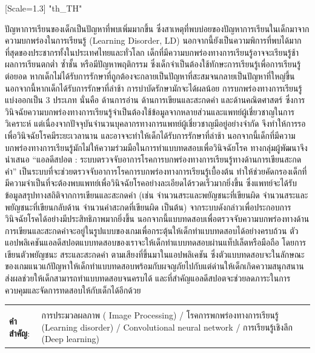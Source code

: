 \documentclass[12pt,oneside,openright,a4paper]{cpe-thai-project}
\begin{document}
{\newfontfamily{}[Scale=1.3]
\XeTeXlinebreaklocale "th_TH"	
\thaifont
\thaiabstract

ปัญหาการเรียนของเด็กเป็นปัญหาที่พบเพิ่มมากขึ้น ซึ่งสาเหตุที่พบบ่อยของปัญหาการเรียนในเด็กมาจากความบกพร่องในการเรียนรู้ (Learning Disorder, LD)
 นอกจากนี้ยังเป็นความพิการที่พบได้มากที่สุดของประชากรทั้งในประเทศไทยและทั่วโลก เด็กที่มีความบกพร่องทางการเรียนรู้อาจจะเรียนรู้ช้า ผลการเรียนตกต่ำ ซ้ำชั้น หรือมีปัญหาพฤติกรรม ซึ่งเด็กจำเป็นต้องใช้ทักษะการเรียนรู้เพื่อการเรียนรู้ต่อยอด
  หากเด็กไม่ได้รับการรักษาที่ถูกต้องจะกลายเป็นปัญหาที่สะสมจนกลายเป็นปัญหาที่ใหญ่ขึ้น นอกจากนี้หากเด็กได้รับการรักษาที่ล่าช้า การบำบัดรักษามักจะได้ผลน้อย  การบกพร่องทางการเรียนรู้แบ่งออกเป็น 3 ประเภท นั่นคือ ด้านการอ่าน ด้านการเขียนและสะกดคำ
   และด้านคณิตศาสตร์ ซึ่งการวินิจฉัยความบกพร่องทางการเรียนรู้จำเป็นต้องใช้ข้อมูลจากหลายส่วนและแพทย์ผู้เชี่ยวชาญในการวิเคราะห์ แต่เนื่องจากปัจจุบันจำนวนบุคลากรทางการแพทย์ผู้เชี่ยวชาญมีอยู่อย่างจำกัด จึงทำให้การรอเพื่อวินิจฉัยโรคมีระยะเวลานาน 
   และอาจจะทำให้เด็กได้รับการรักษาที่ล่าช้า นอกจากนี้เด็กที่มีความบกพร่องทางการเรียนรู้มักไม่ให้ความร่วมมือในการทำแบบทดสอบเพื่อวินิจฉัยโรค ทางกลุ่มผู้พัฒนาจึงนำเสนอ “แอลดีสปอต :  ระบบตรวจจับอาการโรคการบกพร่องทางการเรียนรู้ทางด้านการเขียนสะกดคำ”  
   เป็นระบบที่จะช่วยตรวจจับอาการโรคการบกพร่องทางการเรียนรู้เบื้องต้น ทำให้ช่วยคัดกรองเด็กที่มีความจำเป็นที่จะต้องพบแพทย์เพื่อวินิจฉัยโรคอย่างละเอียดได้รวดเร็วมากยิ่งขึ้น ซึ่งแพทย์จะได้รับข้อมูลสรุปทางสถิติจากการเขียนและสะกดคำ (เช่น จำนวนสระและพยัญชนะที่เขียนผิด 
   จำนวนสระและพยัญชนะที่เขียนกลับด้าน จำนวนคำสะกดที่เขียนผิด เป็นต้น) จากระบบดังกล่าวเพื่อประกอบการวินิจฉัยโรคได้อย่างมีประสิทธิภาพมากยิ่งขึ้น
    นอกจากนี้แบบทดสอบเพื่อตรวจจับความบกพร่องทางด้านการเขียนและสะกดคำจะอยู่ในรูปแบบของเกมเพื่อกระตุ้นให้เด็กทำแบบทดสอบได้อย่างครบถ้วน ตัวแอปพลิเคชันแอลดีสปอตแบบทดสอบของเราจะให้เด็กทำแบบทดสอบผ่านแท็ปเล็ตหรือมือถือ 
    โดยการเขียนตัวพยัญชนะ สระและสะกดคำ ตามเสียงที่ขึ้นมาในแอปพลิเคชัน ซึ่งตัวแบบทดสอบจะในลักษณะของเกมแนวแก้ปัญหาให้เด็กทำแบบทดสอบพร้อมกับผจญภัยไปกับแต่ด่านให้เด็กเกิดความสนุกสนาน ส่งผลช่วยให้เด็กสามารถทำแบบทดสอบจนครบได้
     และที่สำคัญแอลดีสปอตจะช่วยลดภาระในการควบคุมและจัดการทดสอบให้กับเด็กได้อีกด้วย


\begin{flushleft}
\begin{tabular*}{\textwidth}{@{}lp{}}
 & \\

\textbf{คำสำคัญ}: & การประมวลผลภาพ ( Image Processing) / โรคการพกพร่องทางการเรียนรู้ (Learning disorder) / Convolutional neural network / การเรียนรู้เชิงลึก (Deep learning)
\end{tabular*}
\end{flushleft}
\endabstract
}
\end{document}
